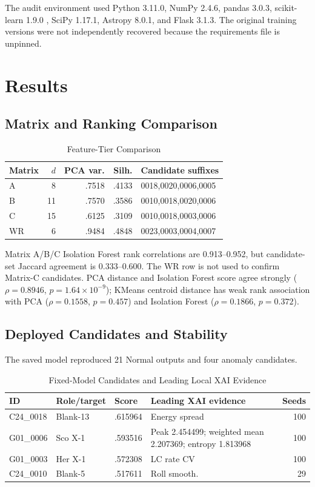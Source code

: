 \documentclass[conference]{IEEEtran}
\begin{document}
The audit environment used Python 3.11.0, NumPy 2.4.6, pandas 3.0.3, scikit-learn 1.9.0 \cite{pedregosa2011sklearn}, SciPy 1.17.1, Astropy 8.0.1, and Flask 3.1.3. The original training versions were not independently recovered because the requirements file is unpinned.

\section{Results}

\subsection{Matrix and Ranking Comparison}

\begin{table}[t]
\caption{Feature-Tier Comparison}
\label{tab:ablation}
\centering
\small
\begin{tabular}{lrrrl}
\toprule
Matrix & \(d\) & PCA var. & Silh. & Candidate suffixes \\
\midrule
A & 8 & .7518 & .4133 & 0018,0020,0006,0005 \\
B & 11 & .7570 & .3586 & 0010,0018,0020,0006 \\
C & 15 & .6125 & .3109 & 0010,0018,0003,0006 \\
WR & 6 & .9484 & .4848 & 0023,0003,0004,0007 \\
\bottomrule
\end{tabular}
\end{table}

Matrix A/B/C Isolation Forest rank correlations are 0.913--0.952, but candidate-set Jaccard agreement is 0.333--0.600. The WR row is not used to confirm Matrix-C candidates. PCA distance and Isolation Forest score agree strongly (\(\rho=0.8946\), \(p=1.64\times10^{-9}\)); KMeans centroid distance has weak rank association with PCA (\(\rho=0.1558\), \(p=0.457\)) and Isolation Forest (\(\rho=0.1866\), \(p=0.372\)).

\subsection{Deployed Candidates and Stability}

The saved model reproduced 21 Normal outputs and four anomaly candidates.

\begin{table}[t]
\caption{Fixed-Model Candidates and Leading Local XAI Evidence}
\label{tab:candidates}
\centering
\small
\begin{tabular}{lll p{7.2cm} r}
\toprule
ID & Role/target & Score & Leading XAI evidence & Seeds \\
\midrule
C24\_0018 & Blank-13 & .615964 & Energy spread & 100 \\
G01\_0006 & Sco X-1 & .593516 & Peak 2.454499; weighted mean 2.207369; entropy 1.813968 & 100 \\
G01\_0003 & Her X-1 & .572308 & LC rate CV & 100 \\
C24\_0010 & Blank-5 & .517611 & Roll smooth. & 29 \\
\bottomrule
\end{tabular}
\end{table}
\end{document}
